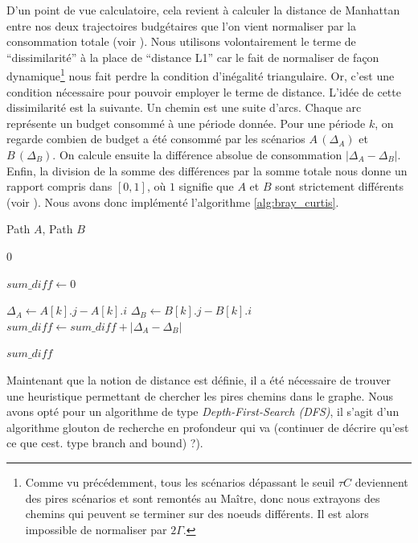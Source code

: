 \documentclass[12pt, a4paper, twoside]{report}
\numberwithin{equation}{section}
\begin{document}
\begin{Figure}[H]
	D'un point de vue calculatoire, cela revient à calculer la distance de Manhattan entre nos deux trajectoires budgétaires que l'on vient normaliser par la consommation totale (voir \cite{RICOTTA2022109880}). Nous utilisons volontairement le terme de \enquote{dissimilarité} à la place de \enquote{distance L1} car le fait de normaliser de façon dynamique\footnote{Comme vu précédemment, tous les scénarios dépassant le seuil $\tau C$ deviennent des pires scénarios et sont remontés au Maître, donc nous extrayons des chemins qui peuvent se terminer sur des noeuds différents. Il est alors impossible de normaliser par $2\Gamma$.} nous fait perdre la condition d'inégalité triangulaire. Or, c'est une condition nécessaire pour pouvoir employer le terme de distance. L'idée de cette dissimilarité est la suivante. Un chemin est une suite d'arcs. Chaque arc représente un budget consommé à une période donnée. Pour une période $k$, on regarde combien de budget a été consommé par les scénarios $A\, (\Delta_A)$ et $B\, (\Delta_B)$. On calcule ensuite la différence absolue de consommation $|\Delta_A - \Delta_B|$. Enfin, la division de la somme des différences par la somme totale nous donne un rapport compris dans $[0, 1]$, où $1$ signifie que $A$ et $B$ sont strictement différents (voir \cite{RICOTTA2017201}). Nous avons donc implémenté l'algorithme \ref{alg:bray_curtis}.
	
	\begin{algorithm}[H]
		\caption{Calculation of the Manhattan distance}
		\label{alg:bray_curtis}
		\begin{algorithmic}[1]
			\Require Path $A$, Path $B$
			
			 
			\State \Return $0$
			\EndIf
			
			\State $sum\_diff \gets 0$
			
    			\State $\Delta_A \gets A[k].j - A[k].i$ 
    			\State $\Delta_B \gets B[k].j - B[k].i$            
    			\State $sum\_diff \gets sum\_diff + |\Delta_A - \Delta_B|$ 
			\EndFor
			
			\State \Return $sum\_diff$
		\end{algorithmic}
	\end{algorithm}
	
	Maintenant que la notion de distance est définie, il a été nécessaire de trouver une heuristique permettant de chercher les pires chemins dans le graphe. Nous avons opté pour un algorithme de type \textit{Depth-First-Search (DFS)}, il s'agit d'un algorithme glouton de recherche en profondeur qui va (continuer de décrire qu'est ce que cest. type branch and bound) ?).
	

\end{Figure}
\end{document}
